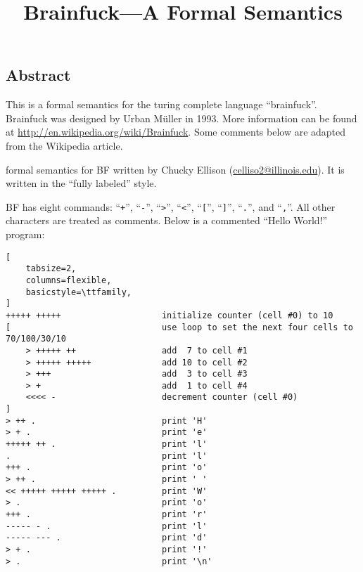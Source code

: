 \title{Brainfuck---A Formal Semantics}
\maketitle

\begin{latexComment}
\section*{Abstract}
\par{This is a formal semantics for the turing complete language ``brainfuck''.  Brainfuck was designed by Urban M\"uller in 1993.  More information can be found at \url{http://en.wikipedia.org/wiki/Brainfuck}.}  Some comments below are adapted from the Wikipedia article.
	
\par{\K formal semantics for BF written by Chucky Ellison (\href{mailto:celliso2@illinois.edu}{celliso2@illinois.edu}).  It is written in the ``fully labeled'' style.}
\end{latexComment}

\begin{latexComment}
BF has eight commands: ``\texttt{+}'', ``\texttt{-}'', ``\texttt{>}'', ``\texttt{<}'', ``\texttt{[}'', ``\texttt{]}'', ``\texttt{.}'', and ``\texttt{,}''.  All other characters are treated as comments.  Below is a commented ``Hello World!'' program:

\begin{lstlisting}[
	tabsize=2,
	columns=flexible,
	basicstyle=\ttfamily,
]
+++++ +++++                    initialize counter (cell #0) to 10
[                              use loop to set the next four cells to 70/100/30/10
    > +++++ ++                 add  7 to cell #1
    > +++++ +++++              add 10 to cell #2 
    > +++                      add  3 to cell #3
    > +                        add  1 to cell #4
    <<<< -                     decrement counter (cell #0)
]                   
> ++ .                         print 'H'
> + .                          print 'e'
+++++ ++ .                     print 'l'
.                              print 'l'
+++ .                          print 'o'
> ++ .                         print ' '
<< +++++ +++++ +++++ .         print 'W'
> .                            print 'o'
+++ .                          print 'r'
----- - .                      print 'l'
----- --- .                    print 'd'
> + .                          print '!'
> .                            print '\n'
\end{lstlisting}
\end{latexComment}